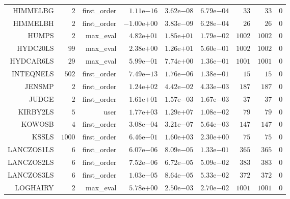 \begin{longtable}{rrrrrrrrr}
HIMMELBG & \(     2\) & first\_order & \( 1.11\)e\(-16\) & \( 3.62\)e\(-08\) & \( 6.79\)e\(-04\) & \(    33\) & \(    33\) & \(     0\) \\
HIMMELBH & \(     2\) & first\_order & \(-1.00\)e\(+00\) & \( 3.83\)e\(-09\) & \( 6.28\)e\(-04\) & \(    26\) & \(    26\) & \(     0\) \\
HUMPS & \(     2\) & max\_eval & \( 4.82\)e\(+01\) & \( 1.85\)e\(+01\) & \( 1.79\)e\(-02\) & \(  1002\) & \(  1002\) & \(     0\) \\
HYDC20LS & \(    99\) & max\_eval & \( 2.38\)e\(+00\) & \( 1.26\)e\(+01\) & \( 5.60\)e\(-01\) & \(  1002\) & \(  1002\) & \(     0\) \\
HYDCAR6LS & \(    29\) & max\_eval & \( 5.99\)e\(-01\) & \( 7.74\)e\(+00\) & \( 1.36\)e\(-01\) & \(  1001\) & \(  1001\) & \(     0\) \\
INTEQNELS & \(   502\) & first\_order & \( 7.49\)e\(-13\) & \( 1.76\)e\(-06\) & \( 1.38\)e\(-01\) & \(    15\) & \(    15\) & \(     0\) \\
JENSMP & \(     2\) & first\_order & \( 1.24\)e\(+02\) & \( 4.42\)e\(-02\) & \( 4.33\)e\(-03\) & \(   187\) & \(   187\) & \(     0\) \\
JUDGE & \(     2\) & first\_order & \( 1.61\)e\(+01\) & \( 1.57\)e\(-03\) & \( 1.67\)e\(-03\) & \(    37\) & \(    37\) & \(     0\) \\
KIRBY2LS & \(     5\) & user & \( 1.77\)e\(+03\) & \( 1.29\)e\(+07\) & \( 1.08\)e\(-02\) & \(    79\) & \(    79\) & \(     0\) \\
KOWOSB & \(     4\) & first\_order & \( 3.08\)e\(-04\) & \( 3.21\)e\(-07\) & \( 5.64\)e\(-03\) & \(   147\) & \(   147\) & \(     0\) \\
KSSLS & \(  1000\) & first\_order & \( 6.46\)e\(-01\) & \( 1.60\)e\(+03\) & \( 2.30\)e\(+00\) & \(    75\) & \(    75\) & \(     0\) \\
LANCZOS1LS & \(     6\) & first\_order & \( 6.07\)e\(-06\) & \( 8.09\)e\(-05\) & \( 1.33\)e\(-01\) & \(   365\) & \(   365\) & \(     0\) \\
LANCZOS2LS & \(     6\) & first\_order & \( 7.52\)e\(-06\) & \( 6.72\)e\(-05\) & \( 5.09\)e\(-02\) & \(   383\) & \(   383\) & \(     0\) \\
LANCZOS3LS & \(     6\) & first\_order & \( 1.03\)e\(-05\) & \( 8.64\)e\(-05\) & \( 5.33\)e\(-02\) & \(   372\) & \(   372\) & \(     0\) \\
LOGHAIRY & \(     2\) & max\_eval & \( 5.78\)e\(+00\) & \( 2.50\)e\(-03\) & \( 2.70\)e\(-02\) & \(  1001\) & \(  1001\) & \(     0\) \\

\end{longtable}
